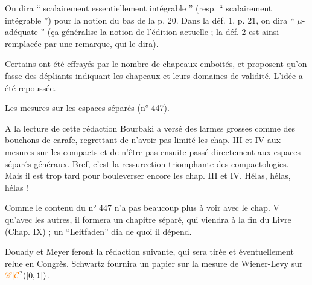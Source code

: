 On dira `` scalairement essentiellement intégrable '' (resp. `` scalairement intégrable '') pour la notion du bas de la p. 20. Dans la déf. 1, p. 21, on dira `` $\mu$-adéquate '' (ça généralise la notion de l'édition actuelle ; la déf. 2 est ainsi remplacée par une remarque, qui le dira).

Certains ont été effrayés par le nombre de chapeaux emboités, et proposent qu'on fasse des dépliants indiquant les chapeaux et leurs domaines de validité. L'idée a été repoussée.

\uline{Les mesures sur les espaces séparés} (n° 447).

A la lecture de cette rédaction Bourbaki a versé des larmes grosses comme des bouchons de carafe, regrettant de n'avoir pas limité les chap. III et IV aux mesures sur les compacts et de n'être pas ensuite passé directement aux espaces séparés généraux. Bref, c'est la ressurection triomphante des compactologies. Mais il est trop tard pour bouleverser encore les chap. III et IV. Hélas, hélas, hélas !

Comme le contenu du n° 447 n'a pas beaucoup plus à voir avec le chap. V qu'avec les autres, il formera un chapitre séparé, qui viendra à la fin du Livre (Chap. IX) ; un ``Leitfaden'' dia de quoi il dépend.

Douady et Meyer feront la rédaction suivante, qui sera tirée et éventuellement relue en Congrès. Schwartz fournira un papier sur la mesure de Wiener-Levy sur $\handwritten{\unsure{\mathscr C|\mathcal C}}([0,1])$.



